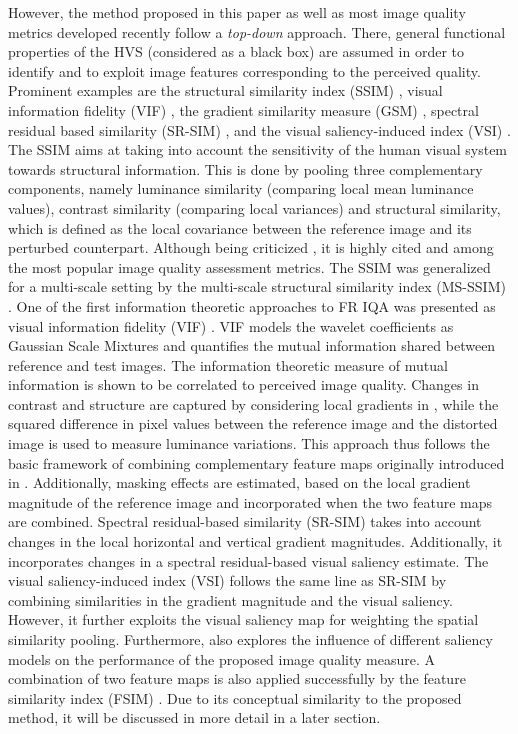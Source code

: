 \documentclass[11pt,a4paper]{article}
\begin{document}
However, the method proposed in this paper as well as most image quality
metrics developed recently follow a \textit{top-down} approach. There, general
functional properties of the HVS (considered as a black box) are assumed in
order to identify and to exploit image features corresponding to the perceived
quality. Prominent examples are the structural similarity index (SSIM)
\cite{WBSS2004}, visual information fidelity (VIF) \cite{ShBo2006}, the gradient
similarity measure (GSM) \cite{LLN2012}, spectral residual based similarity
(SR-SIM) \cite{ZhLi2012}, and the visual saliency-induced index (VSI)
\cite{ZSL2014}.   
The SSIM \cite{WBSS2004} aims at taking into account the sensitivity of the human
visual system towards structural information. This is done by pooling three
complementary components, namely luminance similarity (comparing local mean
luminance values), contrast similarity (comparing local variances) and
structural similarity, which is defined as the local covariance between the
reference image and its perturbed counterpart. Although being criticized
\cite{DoYa2011}, it is highly cited and among the most popular image quality
assessment metrics.  
The SSIM was generalized for a multi-scale setting by the multi-scale structural
similarity index (MS-SSIM) \cite{WSB2003}. 
One of the first information theoretic approaches to FR IQA was presented as visual information fidelity (VIF) \cite{ShBo2006}. VIF models the wavelet coefficients as Gaussian Scale Mixtures and quantifies the mutual information shared between reference and test images. The information theoretic measure of mutual information is  shown to be correlated to perceived image quality.
Changes in contrast and structure are captured by
considering local gradients in \cite{LLN2012}, while the squared difference in
pixel values between the reference image and the distorted image is used to
measure luminance variations. This approach thus follows the basic framework of combining complementary feature maps originally introduced
in \cite{WBSS2004}. Additionally, masking effects are estimated, based
on the local gradient magnitude of the reference image and incorporated when the
two feature maps are combined.  
Spectral residual-based similarity (SR-SIM) \cite{ZhLi2012} takes into account
changes in the local horizontal and vertical gradient magnitudes. Additionally,
it incorporates changes in a spectral residual-based visual saliency estimate.  
The visual saliency-induced index (VSI) \cite{ZSL2014} follows the same line as
SR-SIM by combining similarities in the gradient magnitude and the visual
saliency.  However, it further exploits the visual saliency map for weighting
the spatial similarity pooling. Furthermore, \cite{ZSL2014} also explores the
influence of different saliency models on the performance of the proposed image
quality measure.  
A combination of two feature maps is also applied successfully by the feature
similarity index (FSIM) \cite{ZZMZ2011}. Due to its conceptual similarity to
the proposed method, it will be discussed in more detail in a later section.
\end{document}
